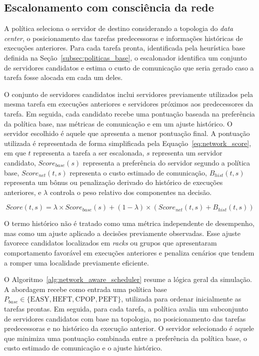 \documentclass[12pt]{article}
\begin{document}
\subsection{Escalonamento com consciência da rede}
\label{subsec:politica_network_aware}

A política seleciona o servidor de destino considerando a topologia do \textit{data center}, o posicionamento das tarefas predecessoras e informações históricas de execuções anteriores. 
%
Para cada tarefa pronta, identificada pela heurística base definida na Seção~\ref{subsec:politicas_base}, o escalonador identifica um conjunto de servidores candidatos e estima o custo de comunicação que seria gerado caso a tarefa fosse alocada em cada um deles.

O conjunto de servidores candidatos inclui servidores previamente utilizados pela mesma tarefa em execuções anteriores e servidores próximos aos predecessores da tarefa.
%
Em seguida, cada candidato recebe uma pontuação baseada na preferência da política base, nas métricas de comunicação e em um ajuste histórico. 
%
O servidor escolhido é aquele que apresenta a menor pontuação final.
%
A pontuação utilizada é representada de forma simplificada pela Equação~\ref{eq:network_score}, em que $t$ representa a tarefa a ser escalonada, $s$ representa um servidor candidato, $Score_{base}(s)$ representa a preferência do servidor segundo a política base, $Score_{net}(t,s)$ representa o custo estimado de comunicação, $B_{hist}(t,s)$ representa um bônus ou penalização derivado do histórico de execuções anteriores, e $\lambda$ controla o peso relativo dos componentes na decisão.

\begin{equation}
Score(t,s) = \lambda \times Score_{base}(s) + (1 - \lambda) \times \left(Score_{net}(t,s) + B_{hist}(t,s)\right)
\label{eq:network_score}
\end{equation}

O termo histórico não é tratado como uma métrica independente de desempenho, mas como um ajuste aplicado a decisões previamente observadas. 
%
Esse ajuste favorece candidatos localizados em \textit{racks} ou grupos que apresentaram comportamento favorável em execuções anteriores e penaliza cenários que tendem a romper uma localidade previamente eficiente.

O Algoritmo~\ref{alg:network_aware_scheduler} resume a lógica geral da simulação.
%
A abordagem recebe como entrada uma política base $P_{base} \in \{\text{EASY}, \text{HEFT}, \text{CPOP}, \text{PEFT}\}$, utilizada para ordenar inicialmente as tarefas prontas.
%
Em seguida, para cada tarefa, a política avalia um subconjunto de servidores candidatos com base na topologia, no posicionamento das tarefas predecessoras e no histórico da execução anterior. 
%
O servidor selecionado é aquele que minimiza uma pontuação combinada entre a preferência da política base, o custo estimado de comunicação e o ajuste histórico.
\end{document}
